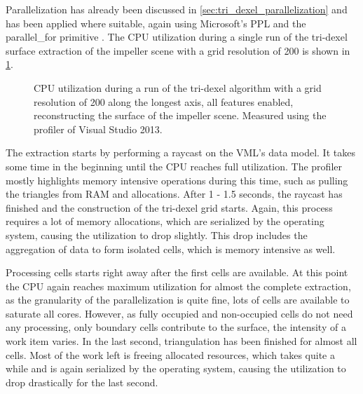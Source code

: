 Parallelization has already been discussed in \cref{sec:tri_dexel_parallelization} and has been applied where suitable, again using Microsoft's PPL and the parallel\_for primitive \cite{ppl_parallel_for}.
The CPU utilization during a single run of the tri-dexel surface extraction of the impeller scene with a grid resolution of 200 is shown in \cref{fig:td_hq_impeller_cpu}.
%
\begin{figure}
	\centering
	\caption{
		CPU utilization during a run of the tri-dexel algorithm with a grid resolution of 200 along the longest axis, all features enabled, reconstructing the surface of the impeller scene.
		Measured using the profiler of Visual Studio 2013.
	}
	\label{fig:td_hq_impeller_cpu}
\end{figure}
%
The extraction starts by performing a raycast on the VML's data model.
It takes some time in the beginning until the CPU reaches full utilization.
The profiler mostly highlights memory intensive operations during this time, such as pulling the triangles from RAM and allocations.
After 1 - 1.5 seconds, the raycast has finished and the construction of the tri-dexel grid starts.
Again, this process requires a lot of memory allocations, which are serialized by the operating system, causing the utilization to drop slightly.
This drop includes the aggregation of data to form isolated cells, which is memory intensive as well.

Processing cells starts right away after the first cells are available.
At this point the CPU again reaches maximum utilization for almost the complete extraction, as the granularity of the parallelization is quite fine, \ie lots of cells are available to saturate all cores.
However, as fully occupied and non-occupied cells do not need any processing, only boundary cells contribute to the surface, the intensity of a work item varies.
In the last second, triangulation has been finished for almost all cells.
Most of the work left is freeing allocated resources, which takes quite a while and is again serialized by the operating system, causing the utilization to drop drastically for the last second.

